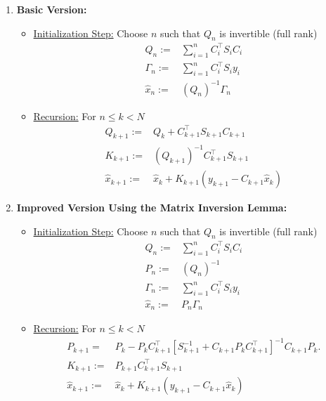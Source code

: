 \documentclass[letterpaper]{article}
\begin{document}
  \begin{enumerate}
\setlength{\itemsep}{.1in}
\renewcommand{\labelenumi}{(\alph{enumi})}

\item \textbf{Basic Version:}

         \begin{itemize}
        \item \underline{Initialization Step:} Choose $n$ such that $Q_n$ is invertible (full rank)
        \begin{align*}
        Q_n:=&\sum_{i=1}^n C_i^\top S_i C_i \\
        \Gamma_n:=&\sum_{i=1}^n C_i^\top S_i y_i \\
        \hat{x}_n:=& (Q_n)^{-1} \Gamma_n
        \end{align*}


        \item \underline{Recursion:} For $n \le k < N$
        \begin{align*}
        Q_{k+1}:=& Q_k + C_{k+1}^\top S_{k+1}C_{k+1}\\
        K_{k+1}:= & (Q_{k+1})^{-1} C_{k+1}^\top S_{k+1} \\
         \hat{x}_{k+1}:=&   \hat{x}_{k} + K_{k+1} \left( y_{k+1} - C_{k+1} \hat{x}_{k}  \right)
        \end{align*}

         \end{itemize}

        \item  \textbf{Improved Version Using the Matrix Inversion Lemma:}
 \begin{itemize}


        \item \underline{Initialization Step:} Choose $n$ such that $Q_n$ is invertible (full rank)
        \begin{align*}
        Q_n:=&\sum_{i=1}^n C_i^\top S_i C_i \\
        P_n:= &(Q_n)^{-1} \\
        \Gamma_n:=&\sum_{i=1}^n C_i^\top S_i y_i \\
        \hat{x}_n:=& P_n \Gamma_n
        \end{align*}

        \item \underline{Recursion:} For $n \le k < N$
        \begin{align*}
         P_{k+1}  =&  P_k -  P_k C_{k+1}^\top [ S_{k+1}^{-1} +  C_{k+1}  P_k  C_{k+1}^\top ]^{-1}C_{k+1} P_k.\\
        K_{k+1}:= & P_{k+1} C_{k+1}^\top S_{k+1} \\
         \hat{x}_{k+1}:=&   \hat{x}_{k} + K_{k+1} \left( y_{k+1} - C_{k+1} \hat{x}_{k}  \right)
        \end{align*}


\end{itemize}
\end{enumerate}
\end{document}
